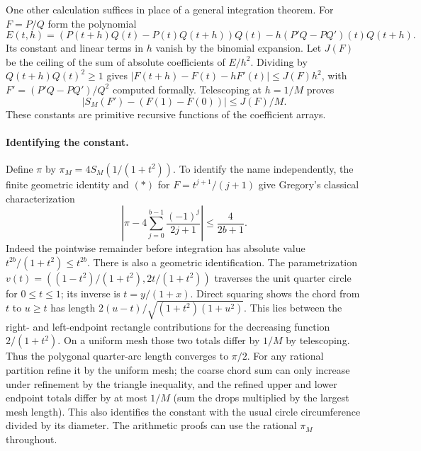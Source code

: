 One other calculation suffices in place of a general integration theorem.
For $F=P/Q$ form the polynomial
\[
 E(t,h)=(P(t+h)Q(t)-P(t)Q(t+h))Q(t)
       -h(P'Q-PQ')(t)Q(t+h).
\]
Its constant and linear terms in $h$ vanish by the binomial expansion.
Let $J(F)$ be the ceiling of the sum of absolute coefficients of
$E/h^2$. Dividing by $Q(t+h)Q(t)^2\ge1$ gives
$|F(t+h)-F(t)-hF'(t)|\le J(F)h^2$, with
$F'=(P'Q-PQ')/Q^2$ computed formally. Telescoping at $h=1/M$ proves
\[
 |S_M(F')-(F(1)-F(0))|\le J(F)/M.                  \tag{*}
\]
These constants are primitive recursive functions of the coefficient arrays.

\paragraph{Identifying the constant.}
Define $\pi$ by $\pi_M=4S_M(1/(1+t^2))$. To identify the name independently,
the finite geometric identity and $(*)$ for
$F=t^{j+1}/(j+1)$ give Gregory's classical characterization
\[
 \left|\pi-4\sum_{j=0}^{b-1}\frac{(-1)^j}{2j+1}\right|
       \le\frac4{2b+1}.
\]
Indeed the pointwise remainder before integration has absolute value
$t^{2b}/(1+t^2)\le t^{2b}$. There is also a geometric identification.
The parametrization $v(t)=((1-t^2)/(1+t^2),2t/(1+t^2))$ traverses the
unit quarter circle for $0\le t\le1$; its inverse is $t=y/(1+x)$.
Direct squaring shows the chord from $t$ to $u\ge t$ has length
$2(u-t)/\sqrt{(1+t^2)(1+u^2)}$. This lies between the right- and
left-endpoint rectangle contributions for the decreasing function
$2/(1+t^2)$. On a uniform mesh those two totals differ by
$1/M$ by telescoping. Thus the polygonal quarter-arc length converges
to $\pi/2$. For any rational partition refine it by the uniform mesh;
the coarse chord sum can only increase under refinement by the triangle
inequality, and the refined upper and lower endpoint totals differ by
at most $1/M$ (sum the drops multiplied by the largest mesh length).
This also identifies the constant with the usual circle circumference
divided by its diameter. The arithmetic proofs can use the rational
$\pi_M$ throughout.


